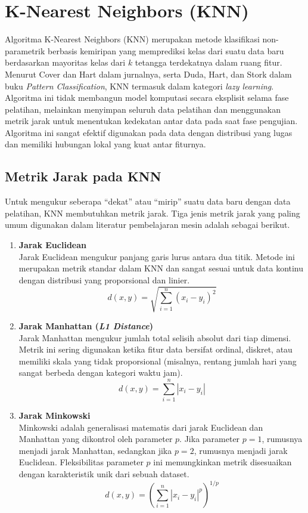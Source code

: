 
\section{{K-Nearest Neighbors} (KNN)}\label{sec:knn}

Algoritma {K-Nearest Neighbors} (KNN) merupakan metode klasifikasi non-parametrik berbasis kemiripan yang memprediksi kelas dari suatu data baru berdasarkan mayoritas kelas dari $k$ tetangga terdekatnya dalam ruang fitur. Menurut Cover dan Hart  \cite{cover1967nearest} dalam jurnalnya, serta Duda, Hart, dan Stork  \cite{duda2001pattern} dalam buku \textit{Pattern Classification}, KNN termasuk dalam kategori \textit{lazy learning}. Algoritma ini tidak membangun model komputasi secara eksplisit selama fase pelatihan, melainkan menyimpan seluruh data pelatihan dan menggunakan metrik jarak untuk menentukan kedekatan antar data pada saat fase pengujian. Algoritma ini sangat efektif digunakan pada data dengan distribusi yang lugas dan memiliki hubungan lokal yang kuat antar fiturnya.

\subsection{Metrik Jarak pada KNN}
Untuk mengukur seberapa ``dekat'' atau ``mirip'' suatu data baru dengan data pelatihan, KNN membutuhkan metrik jarak. Tiga jenis metrik jarak yang paling umum digunakan dalam literatur pembelajaran mesin adalah sebagai berikut.

\begin{enumerate}
    \item \textbf{Jarak Euclidean} \\
    Jarak Euclidean mengukur panjang garis lurus antara dua titik. Metode ini merupakan metrik standar dalam KNN dan sangat sesuai untuk data kontinu dengan distribusi yang proporsional dan linier.
    \[
    d(x, y) = \sqrt{\sum_{i=1}^{n} (x_i - y_i)^2}
    \]
    
    \item \textbf{Jarak Manhattan (\textit{L1 Distance})} \\
    Jarak Manhattan mengukur jumlah total selisih absolut dari tiap dimensi. Metrik ini sering digunakan ketika fitur data bersifat ordinal, diskret, atau memiliki skala yang tidak proporsional (misalnya, rentang jumlah hari yang sangat berbeda dengan kategori waktu jam).
    \[
    d(x, y) = \sum_{i=1}^{n} |x_i - y_i|
    \]
    
    \item \textbf{Jarak Minkowski} \\
    Minkowski adalah generalisasi matematis dari jarak Euclidean dan Manhattan yang dikontrol oleh parameter $p$. Jika parameter $p=1$, rumusnya menjadi jarak Manhattan, sedangkan jika $p=2$, rumusnya menjadi jarak Euclidean. Fleksibilitas parameter $p$ ini memungkinkan metrik disesuaikan dengan karakteristik unik dari sebuah dataset.
    \[
    d(x, y) = \left( \sum_{i=1}^{n} |x_i - y_i|^p \right)^{1/p}
    \]
\end{enumerate}

